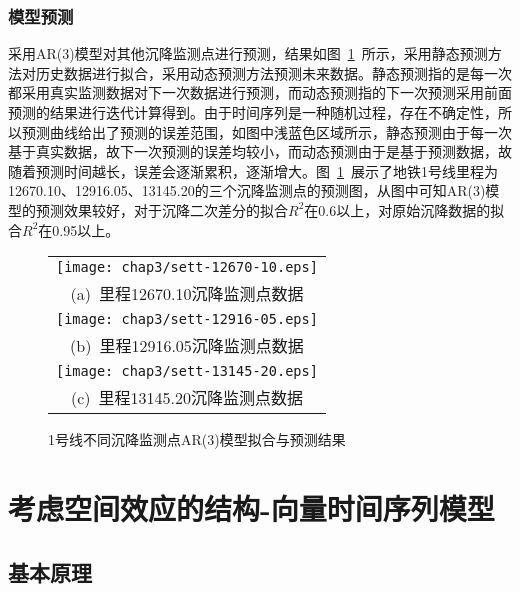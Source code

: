 \subsubsection{模型预测}

采用AR(3)模型对其他沉降监测点进行预测，结果如图~\ref{fig:不同沉降监测点AR3模型拟合与预测结果}~所示，采用静态预测方法对历史数据进行拟合，采用动态预测方法预测未来数据。静态预测指的是每一次都采用真实监测数据对下一次数据进行预测，而动态预测指的下一次预测采用前面预测的结果进行迭代计算得到。由于时间序列是一种随机过程，存在不确定性，所以预测曲线给出了预测的误差范围，如图中浅蓝色区域所示，静态预测由于每一次基于真实数据，故下一次预测的误差均较小，而动态预测由于是基于预测数据，故随着预测时间越长，误差会逐渐累积，逐渐增大。图~\ref{fig:不同沉降监测点AR3模型拟合与预测结果}~展示了地铁1号线里程为 12670.10、12916.05、13145.20的三个沉降监测点的预测图，从图中可知AR(3)模型的预测效果较好，对于沉降二次差分的拟合$R^2$在0.6以上，对原始沉降数据的拟合$R^2$在0.95以上。

\begin{figure}[htbp] 
    \centering 
    \begin{tabular}{c} 
        \texttt{[image: chap3/sett-12670-10.eps]} \\ 
        (a)~里程12670.10沉降监测点数据 \\
        \texttt{[image: chap3/sett-12916-05.eps]} \\ 
        (b)~里程12916.05沉降监测点数据 \\
        \texttt{[image: chap3/sett-13145-20.eps]} \\ 
        (c)~里程13145.20沉降监测点数据 \\
    \end{tabular}
    \caption{1号线不同沉降监测点AR(3)模型拟合与预测结果} 
    \label{fig:不同沉降监测点AR3模型拟合与预测结果} 
\end{figure}

\section{考虑空间效应的结构-向量时间序列模型}

\subsection{基本原理}

